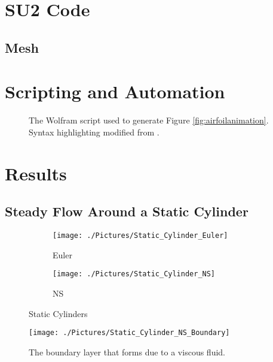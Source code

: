 \documentclass[10pt]{article}
\begin{document}
\section{SU2 Code}
\lipsum[1-2]

\subsection{Mesh}
\lipsum[1-2]

\section{Scripting and Automation}
\lipsum[1-2]

\begin{figure}[p]

\caption[Automated Wolfram Script]{The Wolfram script used to generate Figure \ref{fig:airfoilanimation}. Syntax highlighting modified from \cite{syntax}.}
\label{script}
\end{figure}

\section{Results}
\lipsum[1-2]

\subsection{Steady Flow Around a Static Cylinder}
\lipsum[1-2]

\begin{figure}[htb]
\begin{subfigure}{0.5\linewidth}
  \centering
  \texttt{[image: ./Pictures/Static\_Cylinder\_Euler]}
  \caption{Euler}
  \label{fig:staticeuler}
\end{subfigure}
\begin{subfigure}{0.5\linewidth}
  \centering
  \texttt{[image: ./Pictures/Static\_Cylinder\_NS]}
  \caption{NS}
  \label{fig:staticNS}
\end{subfigure}
\caption[Static Cylinder]{Static Cylinders}
\label{fig:static}
\end{figure}

\begin{figure}[htb]
\centering
\texttt{[image: ./Pictures/Static\_Cylinder\_NS\_Boundary]}
\caption[Boundary Layer Due to Viscous Flow]{The boundary layer that forms due to a viscous fluid.}
\label{boundary}
\end{figure}
\end{document}
